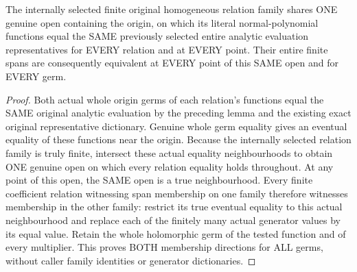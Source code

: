 \begin{lemma}
\label{hir:relative-normal-central-finite-polynomial-representative-comparison}
\leanok
The internally selected finite original homogeneous relation family shares ONE genuine open containing the origin, on which its literal normal-polynomial functions equal the SAME previously selected entire analytic evaluation representatives for EVERY relation and at EVERY point. Their entire finite spans are consequently equivalent at EVERY point of this SAME open and for EVERY germ.
\end{lemma}
\begin{proof}
Both actual whole origin germs of each relation's functions equal the SAME original analytic evaluation by the preceding lemma and the existing exact original representative dictionary. Genuine whole germ equality gives an eventual equality of these functions near the origin. Because the internally selected relation family is truly finite, intersect these actual equality neighbourhoods to obtain ONE genuine open on which every relation equality holds throughout. At any point of this open, the SAME open is a true neighbourhood. Every finite coefficient relation witnessing span membership on one family therefore witnesses membership in the other family: restrict its true eventual equality to this actual neighbourhood and replace each of the finitely many actual generator values by its equal value. Retain the whole holomorphic germ of the tested function and of every multiplier. This proves BOTH membership directions for ALL germs, without caller family identities or generator dictionaries.
\end{proof}

